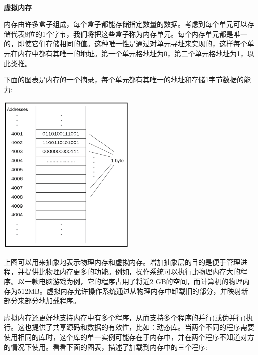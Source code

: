 \noindent\textbf{}\ \par
\textbf{虚拟内存} \ \par
内存由许多盒子组成，每个盒子都能存储指定数量的数据。考虑到每个单元可以存储代表8位的1个字节，我们将把这些盒子称为内存单元。每个内存单元都是唯一的，即使它们存储相同的值。这种唯一性是通过对单元寻址来实现的，这样每个单元在内存中都有其唯一的地址。第一个单元格地址为0，第二个单元格地址为1，以此类推。\par
下面的图表是内存的一个摘录，每个单元都有其唯一的地址和存储1字节数据的能力:\par

\begin{center}
	\includegraphics[width=0.5\textwidth]{content/Section-1/Chapter-2/6}
\end{center}

上图可以用来抽象地表示物理内存和虚拟内存。增加抽象层的目的是便于管理进程，并提供比物理内存更多的功能。例如，操作系统可以执行比物理内存大的程序。以一款电脑游戏为例，它的程序占用了将近2 GB的空间，而计算机的物理内存为512MB。虚拟内存允许操作系统通过从物理内存中卸载旧的部分，并映射新部分来部分地加载程序。 \par
虚拟内存还更好地支持内存中有多个程序，从而支持多个程序的并行(或伪并行)执行。这也提供了共享源码和数据的有效性，比如：动态库。当两个不同的程序需要使用相同的库时，这个库的单一实例可能存在于内存中，并在两个程序不知道对方的情况下使用。看看下面的图表，描述了加载到内存中的三个程序: \par

